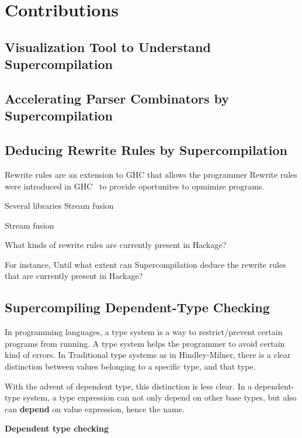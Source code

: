 
\section{Contributions}

\label{sec:contributions}

\subsection{Visualization Tool to Understand Supercompilation}

\subsection{Accelerating Parser Combinators by Supercompilation}

\subsection{Deducing Rewrite Rules by Supercompilation}

Rewrite rules are an extension to GHC that allows the programmer 
Rewrite rules were introduced in GHC~\cite{citeulike:7953458} to provide oportunites to opmimize programs.

Several libraries 
Stream fusion

Stream fusion \cite{Coutts:2007:SFL:1291151.1291199}

What kinds of rewrite rules are currently present in Hackage?


For instance, 
Until what extent can Supercompilation deduce the rewrite rules that are currently present in Hackage?

\subsection{Supercompiling Dependent-Type Checking}


In programming languages, a type system is a way to restrict/prevent certain programs from running.
A type system helps the programmer to avoid certain kind of errors.
In Traditional type systems as in Hindley-Milner, there is a clear distinction between values belonging to a specific type, and that type.

With the advent of dependent type, this distinction is less clear.
In a dependent-type system, a type expression can not only depend on other base types, but also can \textbf{depend} on value expression, hence the name.

\textbf{Dependent type checking}



